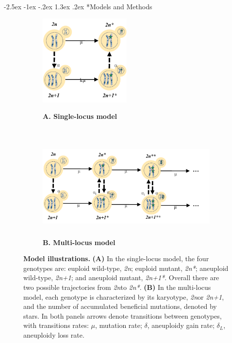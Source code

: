 \documentclass[12pt]{extarticle}
\makeatletter
\renewcommand\section{\@startsection {section}{1}{\z@}%
     {-2.5ex \@plus -1ex \@minus -.2ex}%
     {1.3ex \@plus.2ex}%
    {\Large\bfseries}}
\newcommand{\euwt}{\emph{2n}}
\newcommand{\anwt}{\emph{2n+1}}
\newcommand{\eumt}{\emph{2n*}}
\newcommand{\anmt}{\emph{2n+1*}}
\makeatother
\begin{document}
\pagebreak
\section*{Models and Methods}

\begin{figure}[b!]
  \centering
  \begin{subfigure}[t]{0.5\textwidth}
      \caption{
        \textbf{A. Single-locus model}
      }
      \centering
      \includegraphics[height=1.8in]{../figures/Fig1-A.pdf}      
      \label{fig:model1}
  \end{subfigure}%
  \\
  \begin{subfigure}[t]{0.5\textwidth}
  	  \caption{
        \textbf{B. Multi-locus model}
      }
      \centering
      \includegraphics[height=1.8in]{../figures/Fig1-B.pdf}      
      \label{fig:model2}
  \end{subfigure}
  \caption{
    \textbf{Model illustrations.}
    \textbf{(A)} In the single-locus model, the four genotypes are: euploid wild-type, \euwt; euploid mutant, \eumt; aneuploid wild-type, \anwt; and aneuploid mutant, \anmt.
    Overall there are two possible trajectories from \euwt to \eumt.
    \textbf{(B)} In the multi-locus model, each genotype is characterized by its karyotype, \euwt or \anwt, and the number of accumulated beneficial mutations, denoted by stars. 
    In both panels arrows denote transitions between genotypes, with transitions rates: $\mu$, mutation rate; $\delta$, aneuploidy gain rate; $\delta_L$, aneuploidy loss rate.
  }
  \label{fig:models}
\end{figure}
\end{document}
